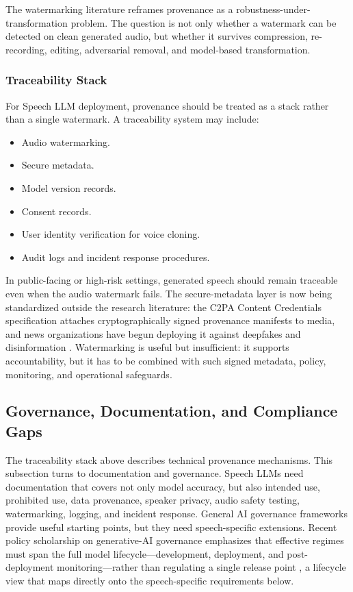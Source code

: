 The watermarking literature reframes provenance as a robustness-under-transformation problem. The question is not only whether a watermark can be detected on clean generated audio, but whether it survives compression, re-recording, editing, adversarial removal, and model-based transformation.

\subsubsection{Traceability Stack}

For Speech LLM deployment, provenance should be treated as a stack rather than a single watermark. A traceability system may include:

\begin{itemize}
\item Audio watermarking.
\item Secure metadata.
\item Model version records.
\item Consent records.
\item User identity verification for voice cloning.
\item Audit logs and incident response procedures.
\end{itemize}

In public-facing or high-risk settings, generated speech should remain traceable even when the audio watermark fails. The secure-metadata layer is now being standardized outside the research literature: the C2PA Content Credentials specification attaches cryptographically signed provenance manifests to media, and news organizations have begun deploying it against deepfakes and disinformation \citep{strickland2024credentials}. Watermarking is useful but insufficient: it supports accountability, but it has to be combined with such signed metadata, policy, monitoring, and operational safeguards.

\subsection{Governance, Documentation, and Compliance Gaps}

The traceability stack above describes technical provenance mechanisms. This subsection turns to documentation and governance. Speech LLMs need documentation that covers not only model accuracy, but also intended use, prohibited use, data provenance, speaker privacy, audio safety testing, watermarking, logging, and incident response. General AI governance frameworks provide useful starting points, but they need speech-specific extensions. Recent policy scholarship on generative-AI governance emphasizes that effective regimes must span the full model lifecycle---development, deployment, and post-deployment monitoring---rather than regulating a single release point \citep{taeihagh2025governance}, a lifecycle view that maps directly onto the speech-specific requirements below.

